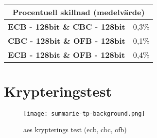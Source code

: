 \begin{table}[H]
  \centering
  \begin{tabular}{ |c|c| }
    \multicolumn{2}{c}{\bfseries{Procentuell skillnad (medelvärde)}} \\
    \hline
    \bfseries{ECB - 128bit \& CBC - 128bit} & 0,3\% \\
    \hline
    \bfseries{CBC - 128bit \& OFB - 128bit} & 0,1\% \\
    \hline
    \bfseries{ECB - 128bit \& OFB - 128bit} & 0,4\% \\
    \hline
  \end{tabular}
\end{table}

\section{Krypteringstest}
\label{sec:krypterings-test}

\begin{figure}[H]
      \centering
    \texttt{[image: summarie-tp-background.png]}
    \caption{\acrshort{aes} krypterings test (\acrshort{ecb}, \acrshort{cbc}, \acrshort{ofb})}
    \label{fig:aes-krypterings-test}
\end{figure}
